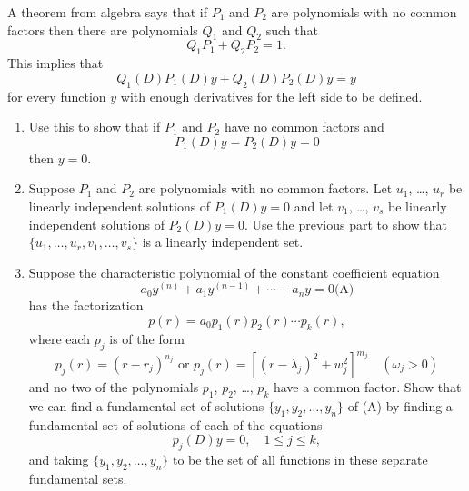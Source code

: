 \documentclass{ximera}
\begin{document}
\begin{problem}\label{exer:9.2.40}
A theorem from algebra says that if $P_1$ and $P_2$ are polynomials
with no common factors then there are polynomials $Q_1$ and $Q_2$
such that
$$
Q_1P_1+Q_2P_2=1.
$$
This implies that
$$
Q_1(D)P_1(D)y+Q_2(D)P_2(D)y=y
$$
for every function $y$ with enough derivatives for the left side to be
defined.

\begin{enumerate}
\item %
Use this to show that if $P_1$ and $P_2$ have no common factors and
$$
P_1(D)y=P_2(D)y=0
$$
then $y=0$.

\item %
Suppose $P_1$ and $P_2$ are polynomials with no common factors.
Let $u_1$, \dots, $u_r$ be linearly independent solutions of $P_1(D)y=0$
and let $v_1$, \dots, $v_s$ be linearly independent solutions of
$P_2(D)y=0$. Use the previous part to show that $\{u_1,\dots,u_r,\allowbreak
v_1,\dots,v_s\}$ is a linearly independent set.

\item %
Suppose the characteristic polynomial of the constant coefficient
equation
$$
a_0y^{(n)}+a_1y^{(n-1)}+\cdots+a_ny=0
\text{(A)}
$$
has the factorization
$$
p(r)=a_0p_1(r)p_2(r)\cdots p_k(r),
$$
where each $p_j$ is of the form
$$
p_j(r)=(r-r_j)^{n_j} \mbox{ or }
p_j(r)=[(r-\lambda_j)^2+w^2_j]^{m_j}\quad  (\omega_j>0)
$$
and no two of the polynomials $p_1$, $p_2$, \dots, $p_k$ have a common
factor. Show that we can find a fundamental set of solutions
$\{y_1,y_2,\dots,y_n\}$ of {\rm(A)} by finding a
fundamental set of solutions of each of the equations
$$
p_j(D)y=0,\quad 1\le j\le k,
$$
 and taking $\{y_1,y_2,\dots,y_n\}$ to be the set of all
functions in these separate fundamental sets.
\end{enumerate}
\end{problem}
\end{document}
